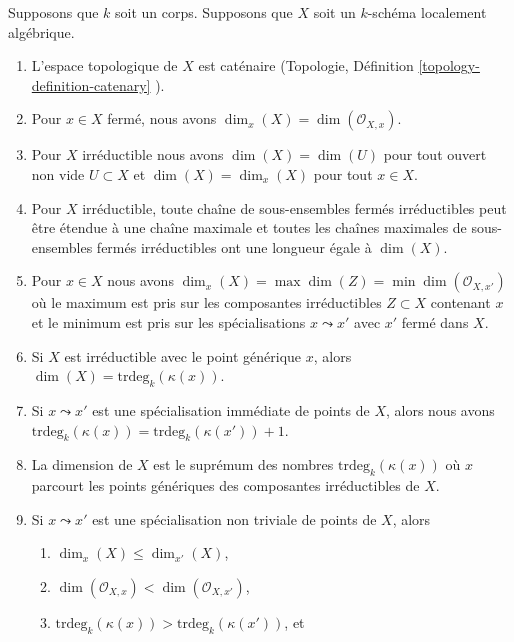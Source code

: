 \begin{lemma}
\label{lemma-dimension-locally-algebraic}
Supposons que $k$ soit un corps. Supposons que $X$ soit un $k$-schéma localement algébrique.
\begin{enumerate}
\item
\label{item-catenary}
L'espace topologique de $X$ est
caténaire (Topologie, Définition
\ref{topology-definition-catenary} ). \item
\label{item-dimension-at-closed-point}
Pour $x \in X$ fermé, nous avons
$\dim_x(X) = \dim(\mathcal{O}_{X, x})$. \item
\label{item-dimension-irreducible}
Pour $X$ irréductible nous avons
$\dim(X) = \dim(U)$ pour tout ouvert
non vide $U \subset X$ et $\dim(X) =
\dim_x(X)$ pour tout $x \in X$. \item
\label{item-irreducible-maximal-chains}
Pour $X$ irréductible, toute chaîne de sous-ensembles
fermés irréductibles peut être étendue à une chaîne
maximale et toutes les chaînes maximales de sous-ensembles
fermés irréductibles ont une longueur égale à $\dim(X)$. \item
\label{item-dimension-irreducibles-passing-through}
Pour $x \in X$ nous avons $\dim_x(X) = \max
\dim(Z) = \min \dim(\mathcal{O}_{X, x'})$ où
le maximum est pris sur les composantes
irréductibles $Z \subset X$ contenant $x$ et
le minimum est pris sur les spécialisations $x
\leadsto x'$ avec $x'$ fermé dans $X$. \item
\label{item-dimension-irreducible-trdeg}
Si $X$ est irréductible avec le
point générique $x$, alors $\dim(X)
= \text{trdeg}_k(\kappa(x))$. \item
\label{item-immediate-specialization}
Si $x \leadsto x'$ est une
spécialisation immédiate de points de $X$,
alors nous avons
$\text{trdeg}_k(\kappa(x)) = \text{trdeg}_k(\kappa(x')) + 1$. \item
\label{item-dimension-sup-trdeg}
La dimension de $X$ est le suprémum des
nombres $\text{trdeg}_k(\kappa(x))$ où
$x$ parcourt les points génériques des
composantes irréductibles de $X$. \item
\label{item-specialization}
Si $x \leadsto x'$ est une spécialisation non triviale de points de $X$, alors
\begin{enumerate}
\item $\dim_x(X) \leq \dim_{x'}(X)$, \item
$\dim(\mathcal{O}_{X, x}) < \dim(\mathcal{O}_{X, x'})$, \item
$\text{trdeg}_k(\kappa(x)) > \text{trdeg}_k(\kappa(x'))$, et

\end{enumerate}
\end{enumerate}
\end{lemma}
